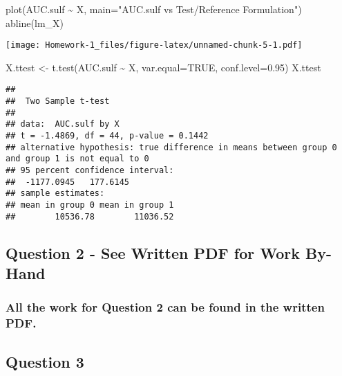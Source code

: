 \documentclass[
]{article}
\newenvironment{Shaded}{\begin{snugshade}}{\end{snugshade}}
\newcommand{\AttributeTok}[1]{\textcolor[rgb]{0.77,0.63,0.00}{#1}}
\newcommand{\ConstantTok}[1]{\textcolor[rgb]{0.00,0.00,0.00}{#1}}
\newcommand{\FloatTok}[1]{\textcolor[rgb]{0.00,0.00,0.81}{#1}}
\newcommand{\FunctionTok}[1]{\textcolor[rgb]{0.00,0.00,0.00}{#1}}
\newcommand{\NormalTok}[1]{#1}
\newcommand{\OtherTok}[1]{\textcolor[rgb]{0.56,0.35,0.01}{#1}}
\newcommand{\SpecialCharTok}[1]{\textcolor[rgb]{0.00,0.00,0.00}{#1}}
\newcommand{\StringTok}[1]{\textcolor[rgb]{0.31,0.60,0.02}{#1}}
\begin{document}
\begin{Shaded}
\begin{Highlighting}[]
\FunctionTok{plot}\NormalTok{(AUC.sulf }\SpecialCharTok{\textasciitilde{}}\NormalTok{ X, }\AttributeTok{main=}\StringTok{"AUC.sulf vs Test/Reference Formulation"}\NormalTok{)}
\FunctionTok{abline}\NormalTok{(lm\_X)}
\end{Highlighting}
\end{Shaded}

\texttt{[image: Homework-1\_files/figure-latex/unnamed-chunk-5-1.pdf]}

\begin{Shaded}
\begin{Highlighting}[]
\NormalTok{X.ttest }\OtherTok{\textless{}{-}} \FunctionTok{t.test}\NormalTok{(AUC.sulf }\SpecialCharTok{\textasciitilde{}}\NormalTok{ X, }\AttributeTok{var.equal=}\ConstantTok{TRUE}\NormalTok{, }\AttributeTok{conf.level=}\FloatTok{0.95}\NormalTok{)}
\NormalTok{X.ttest}
\end{Highlighting}
\end{Shaded}

\begin{verbatim}
## 
##  Two Sample t-test
## 
## data:  AUC.sulf by X
## t = -1.4869, df = 44, p-value = 0.1442
## alternative hypothesis: true difference in means between group 0 and group 1 is not equal to 0
## 95 percent confidence interval:
##  -1177.0945   177.6145
## sample estimates:
## mean in group 0 mean in group 1 
##        10536.78        11036.52
\end{verbatim}

\hypertarget{question-2---see-written-pdf-for-work-by-hand}{%
\subsection{Question 2 - See Written PDF for Work
By-Hand}\label{question-2---see-written-pdf-for-work-by-hand}}

\hypertarget{all-the-work-for-question-2-can-be-found-in-the-written-pdf.}{%
\subsubsection{All the work for Question 2 can be found in the written
PDF.}\label{all-the-work-for-question-2-can-be-found-in-the-written-pdf.}}

\hypertarget{question-3}{%
\subsection{Question 3}\label{question-3}}
\end{document}
